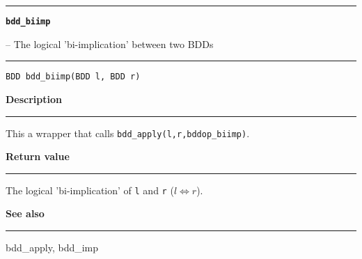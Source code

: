 \vspace{8ex}
\begin{minipage}{\textwidth}

\noindent\begin{minipage}{\textwidth}
\rule{\textwidth}{0.5mm}
{\tt\bf bdd\_biimp }
\--- The logical 'bi-implication' between two BDDs  \hspace{\fill}
\\\rule[1.5ex]{\textwidth}{0.5mm}
\end{minipage}

\noindent\begin{verbatim}
BDD bdd_biimp(BDD l, BDD r) 
\end{verbatim}

\vspace{\parsep}\noindent
{\bf Description}\\\rule[1.5ex]{\textwidth}{0.2mm}\vspace{-1.5ex}\setlength{\parindent}{1em}
This a wrapper that calls {\tt bdd\_apply(l,r,bddop\_biimp)}. 

\setlength{\parindent}{0em}\vspace{\parsep}\vspace{\baselineskip}\noindent
{\bf Return value}\\\rule[1.5ex]{\textwidth}{0.2mm}\vspace{-1.5ex}
The logical 'bi-implication' of {\tt l} and {\tt r} ($l \Leftrightarrow r$). 

\vspace{\parsep}\vspace{\baselineskip}\noindent
{\bf See also}\\\rule[1.5ex]{\textwidth}{0.2mm}\vspace{-1.5ex}
bdd\_apply, bdd\_imp 
\end{minipage}
\vspace{8ex}
